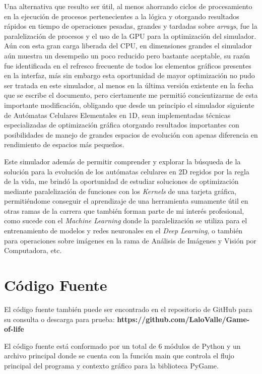 \documentclass[]{article}
\begin{document}
	Una alternativa que resulto ser útil, al menos ahorrando ciclos de procesamiento en la ejecución de procesos pertenecientes a la lógica y otorgando resultados rápidos en tiempo de operaciones pesadas, grandes y tardadas sobre \textit{arrays}, fue la paralelización de procesos y el uso de la GPU para la optimización del simulador. Aún con esta gran carga liberada del CPU, en dimensiones grandes el simulador aún muestra un desempeño un poco reducido pero bastante aceptable, su razón fue identificada en el refresco frecuente de todos los elementos gráficos presentes en la interfaz, más sin embargo esta oportunidad de mayor optimización no pudo ser tratada en este simulador, al menos en la última versión existente en la fecha que se escribe el documento, pero ciertamente me permitió concientizarme de esta importante modificación, obligando que desde un principio el simulador siguiente de Autómatas Celulares Elementales en 1D, sean implementadas técnicas especializadas de optimización gráfica otorgando resultados importantes con posibilidades de manejo de grandes espacios de evolución con apenas diferencia en rendimiento de espacios más pequeños.
	
	Este simulador además de permitir comprender y explorar la búsqueda de la solución para la evolución de los autómatas celulares en 2D regidos por la regla de la vida, me brindó la oportunidad de estudiar soluciones de optimización mediante paralelización de funciones con los \textit{Kernels} de una tarjeta gráfica, permitiéndome conseguir el aprendizaje de una herramienta sumamente útil en otras ramas de la carrera que también forman parte de mi interés profesional, como sucede con el \textit{Machine Learning} donde la paralelización se utiliza para el entrenamiento de modelos y redes neuronales en el \textit{Deep Learning}, o también para operaciones sobre imágenes en la rama de Análisis de Imágenes y Visión por Computadora, etc. 

\newpage
\section{Código Fuente}
	El código fuente también puede ser encontrado en el repositorio de GitHub para su consulta o descarga para prueba: \textbf{https://github.com/LaloValle/Game-of-life}

	El código fuente está conformado por un total de 6 módulos de Python y un archivo principal donde se cuenta con la función main que controla el flujo principal del programa y contexto gráfico para la biblioteca PyGame.
	
\end{document}

